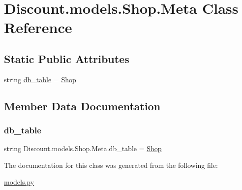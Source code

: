 \hypertarget{class_discount_1_1models_1_1_shop_1_1_meta}{}\section{Discount.\+models.\+Shop.\+Meta Class Reference}
\label{class_discount_1_1models_1_1_shop_1_1_meta}
\subsection*{Static Public Attributes}
\begin{DoxyCompactItemize}
\item 
string \hyperlink{class_discount_1_1models_1_1_shop_1_1_meta_af5ab99e414e46fd3247c0db3ecaf9bb5}{db\+\_\+table} = \textquotesingle{}\hyperlink{class_discount_1_1models_1_1_shop}{Shop}\textquotesingle{}
\end{DoxyCompactItemize}


\subsection{Member Data Documentation}
\mbox{\label{class_discount_1_1models_1_1_shop_1_1_meta_af5ab99e414e46fd3247c0db3ecaf9bb5}} 
\subsubsection{\texorpdfstring{db\+\_\+table}{db\_table}}
{\footnotesize\ttfamily string Discount.\+models.\+Shop.\+Meta.\+db\+\_\+table = \textquotesingle{}\hyperlink{class_discount_1_1models_1_1_shop}{Shop}\textquotesingle{}\hspace{0.3cm}{\ttfamily [static]}}



The documentation for this class was generated from the following file\+:\begin{DoxyCompactItemize}
\item 
\hyperlink{models_8py}{models.\+py}\end{DoxyCompactItemize}
